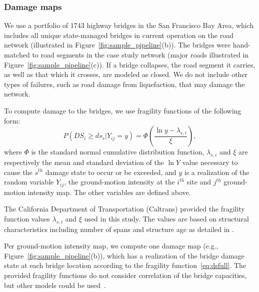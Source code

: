 \subsubsection{Damage maps}%
We use a portfolio of 1743 highway bridges in the San Francisco Bay Area, which includes all unique state-managed bridges in current operation on the road network (illustrated in Figure~\ref{fig:sample_pipeline}{\color{red}(b)}). The bridges were hand-matched to road segments in the case study network (major roads illustrated in Figure~\ref{fig:sample_pipeline}{\color{red}(c)}).  If a bridge collapses, the road segment it carries, as well as that which it crosses, are modeled as closed. We do not include other types of failures, such as road damage from liquefaction, that may damage the network.


To compute damage to the bridges, we use fragility functions of the following form:
\begin{equation}
P(DS_i \geq ds_s |Y_{ij} = y) = \Phi \left( \frac{\ln y - \lambda_{s, i}}{\xi} \right),
\label{eq:dsfull}
\end{equation}
where $\Phi$ is the standard normal cumulative distribution function, $\lambda_{s,i}$ and $\xi$ are respectively the mean and standard deviation of the $\ln Y$ value necessary to cause the $s^{th}$ damage state to occur or be exceeded, and $y$ is a realization of the random variable $Y_{ij}$, the ground-motion intensity at the $i^{th}$ site and $j^{th}$ ground-motion intensity map. The other variables are defined above.


The California Department of Transportation (Caltrans) provided the fragility function values $\lambda_{s,i}$ and $\xi$ used in this study. The values are based on structural characteristics including number of spans and structure age as detailed in \cite{basoz_enhancement_1999}.
%

Per ground-motion intensity map, we compute one damage map (e.g., Figure~\ref{fig:sample_pipeline}{\color{red}(b)}), which has a realization of the bridge damage state at each bridge location according to the fragility function~\eqref{eq:dsfull}. The provided fragility functions do not consider correlation of the bridge capacities, but other models could be used~\cite[e.g.,][]{baker_introducing_2008}.

